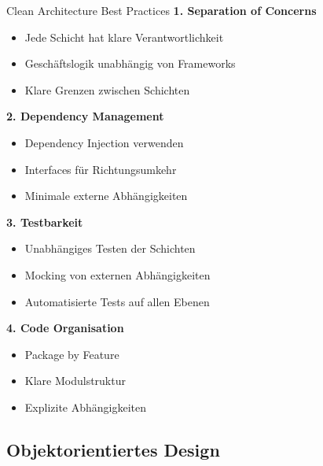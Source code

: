 \begin{concept}{Clean Architecture Best Practices}
\textbf{1. Separation of Concerns}
\begin{itemize}
    \item Jede Schicht hat klare Verantwortlichkeit
    \item Geschäftslogik unabhängig von Frameworks
    \item Klare Grenzen zwischen Schichten
\end{itemize}

\textbf{2. Dependency Management}
\begin{itemize}
    \item Dependency Injection verwenden
    \item Interfaces für Richtungsumkehr
    \item Minimale externe Abhängigkeiten
\end{itemize}

\textbf{3. Testbarkeit}
\begin{itemize}
    \item Unabhängiges Testen der Schichten
    \item Mocking von externen Abhängigkeiten
    \item Automatisierte Tests auf allen Ebenen
\end{itemize}

\textbf{4. Code Organisation}
\begin{itemize}
    \item Package by Feature
    \item Klare Modulstruktur
    \item Explizite Abhängigkeiten
\end{itemize}
\end{concept}

\subsection{Objektorientiertes Design}

